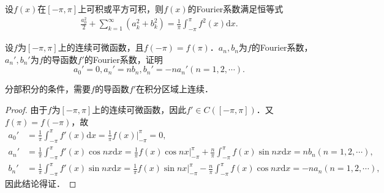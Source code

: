 \documentclass[../../main.tex]{subfiles}
\begin{document}
\begin{theorem}[Parseval恒等式]\label{theorem:Parseval恒等式}
设$f(x)$在$[-\pi,\pi]$上可积或平方可积，则$f(x)$的Fourier系数满足恒等式
\begin{align*}
\frac{a_0^2}{2}+\sum_{k = 1}^{\infty}(a_k^2 + b_k^2)=\frac{1}{\pi}\int_{-\pi}^{\pi}f^2(x)\mathrm{d}x.
\end{align*}
\end{theorem}

\begin{lemma}\label{lemma:Fourier级数与其导函数的系数关系}
设$f$为$[-\pi,\pi]$上的连续可微函数，且$f(-\pi)=f(\pi)$．$a_n,b_n$为$f$的Fourier系数，$a_{n}',b_{n}'$为$f$的导函数$f'$的Fourier系数，证明
$$a_{0}'=0,a_{n}'=nb_n,b_{n}'=-na_{n}'(n=1,2,\cdots).$$
\end{lemma}
\begin{remark}
分部积分的条件，需要$f$的导函数$f'$在积分区域上连续．
\end{remark}
\begin{proof}
由于$f$为$[-\pi,\pi]$上的连续可微函数，因此$f'\in C([-\pi,\pi])$．又$f(\pi)=f(-\pi)$，故
\begin{align*}
a_{0}'&=\frac{1}{\pi}\int_{-\pi}^{\pi}f'(x)\mathrm{d}x=\frac{1}{\pi}f(x)\Big|_{-\pi}^{\pi}=0,\\
a_{n}'&=\frac{1}{\pi}\int_{-\pi}^{\pi}f'(x)\cos nx\mathrm{d}x=\frac{1}{\pi}f(x)\cos nx\Big|_{-\pi}^{\pi}+\frac{n}{\pi}\int_{-\pi}^{\pi}f(x)\sin nx\mathrm{d}x=nb_n(n=1,2,\cdots),\\
b_{n}'&=\frac{1}{\pi}\int_{-\pi}^{\pi}f'(x)\sin nx\mathrm{d}x=\frac{1}{\pi}f(x)\sin nx\Big|_{-\pi}^{\pi}-\frac{n}{\pi}\int_{-\pi}^{\pi}f(x)\cos nx\mathrm{d}x=-na_n(n=1,2,\cdots),
\end{align*}
因此结论得证．

\end{proof}
\end{document}
